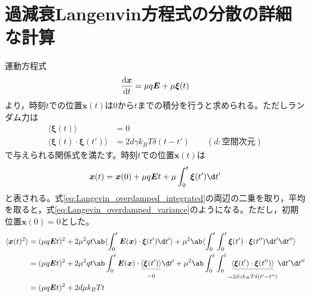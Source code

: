 \documentclass[autodetect-engine,dvi=dvipdfmx,a4paper,ja=standard,oneside,openany,11pt]{bxjsbook}
\begin{document}
\section{過減衰Langenvin方程式の分散の詳細な計算}
\label{sec:Langevin_cal}
運動方程式
\begin{equation}
  \odv{\bm{x}}{t}=\mu q\bm{E}+\mu\bm{\xi}(t)
  \label{eq:Langevin_overdamped}
\end{equation}
より，時刻$t$での位置$\bm{x}(t)$は0から$t$までの積分を行うと求められる。ただしランダム力は
\begin{equation}
  \begin{split}
    \langle\bm{\xi}(t)\rangle                  & =0                                                   \\
    \langle\bm{\xi}(t)\cdot\bm{\xi}(t')\rangle & =2d\gamma k_B T\delta(t-t') \qquad (d:\mathrm{空間次元})
  \end{split}
  \label{eq:random_force}
\end{equation}
で与えられる関係式を満たす。時刻$t$での位置$\bm{x}(t)$は
\begin{equation}
  \bm{x}(t)=\bm{x}(0)+\mu q\bm{E}t+\mu\int_0^t\bm{\xi}(t')\d t'
  \label{eq:Langevin_overdamped_integrated}
\end{equation}
と表される。式\ref{eq:Langevin_overdamped_integrated}の両辺の二乗を取り，平均を取ると，式\eqref{eq:Langevin_overdamped_variance}のようになる。ただし，初期位置$\bm{x}(0)=0$とした。
\begin{equation}
  \begin{split}
    \langle\bm{x}(t)^2\rangle & =(\mu q \bm{E} t)^2+2\mu^2 q t\ab\langle\int_{0}^{t}\bm{E}(\bm{x})\cdot\bm{\xi}(t') \d t'\rangle+\mu^2\ab\langle\int_{0}^{t}\int_{0}^{t}\bm{\xi}(t')\cdot
    \bm{\xi}(t'') \d t' \d t''\rangle                                                                                                                                                                                                                            \\
                              & =(\mu q \bm{E} t)^2+2\mu^2 q t\ab\int_{0}^{t}\bm{E}(\bm{x})\cdot\underset{=0}{\uwave{\langle\bm{\xi}(t')\rangle}} \d t'+\mu^2\ab\int_{0}^{t}\int_{0}^{t}\underset{=2d\gamma k_B T\delta(t'-t'')}{\uwave{\langle\bm{\xi}(t')\cdot
    \bm{\xi}(t'')\rangle}} \d t' \d t''                                                                                                                                                                                                                          \\
                              & =(\mu q \bm{E} t)^2+2d\mu k_B T t                                                                                                                                                                                                \\
  \end{split}
  \label{eq:Langevin_overdamped_variance}
\end{equation}
\end{document}

